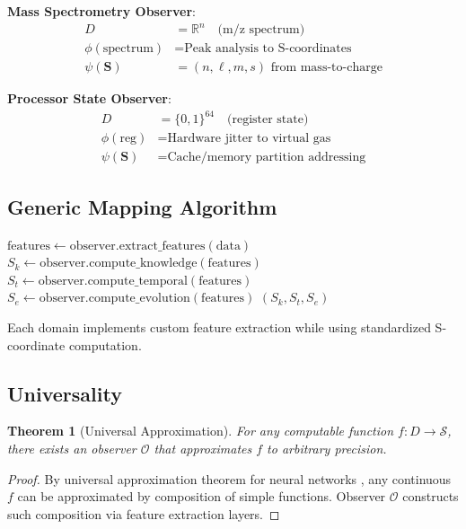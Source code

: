 \documentclass[twocolumn,10pt]{article}
\newtheorem{theorem}{Theorem}
\begin{document}
\textbf{Mass Spectrometry Observer}:
\begin{align}
D &= \mathbb{R}^n \quad \text{(m/z spectrum)} \\
\phi(\text{spectrum}) &= \text{Peak analysis to S-coordinates} \\
\psi(\mathbf{S}) &= (n, \ell, m, s) \text{ from mass-to-charge}
\end{align}

\textbf{Processor State Observer}:
\begin{align}
D &= \{0,1\}^{64} \quad \text{(register state)} \\
\phi(\text{reg}) &= \text{Hardware jitter to virtual gas} \\
\psi(\mathbf{S}) &= \text{Cache/memory partition addressing}
\end{align}

\subsection{Generic Mapping Algorithm}

\begin{algorithm}
\caption{Domain to S-Space Mapping}
\begin{algorithmic}[1]
    \State $\text{features} \gets \text{observer.extract\_features}(\text{data})$
    \State $S_k \gets \text{observer.compute\_knowledge}(\text{features})$
    \State $S_t \gets \text{observer.compute\_temporal}(\text{features})$
    \State $S_e \gets \text{observer.compute\_evolution}(\text{features})$
    \State \Return $(S_k, S_t, S_e)$
\EndProcedure
\end{algorithmic}
\end{algorithm}

Each domain implements custom feature extraction while using standardized S-coordinate computation.

\subsection{Universality}

\begin{theorem}[Universal Approximation]
For any computable function $f: D \to \mathcal{S}$, there exists an observer $\mathcal{O}$ that approximates $f$ to arbitrary precision.
\end{theorem}

\begin{proof}
By universal approximation theorem for neural networks \cite{Cybenko1989}, any continuous $f$ can be approximated by composition of simple functions. Observer $\mathcal{O}$ constructs such composition via feature extraction layers.
\end{proof}
\end{document}
